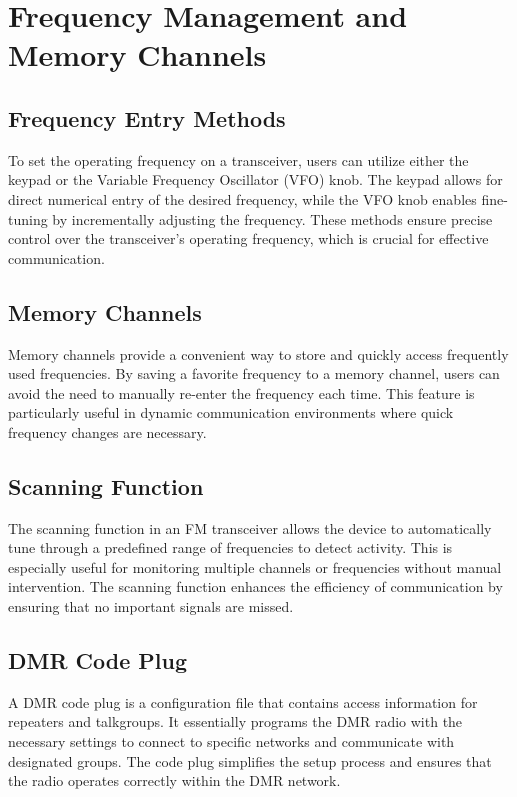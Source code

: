\section{Frequency Management and Memory Channels}
\label{section:frequency_management}

\subsection*{Frequency Entry Methods}
To set the operating frequency on a transceiver, users can utilize either the keypad or the Variable Frequency Oscillator (VFO) knob. The keypad allows for direct numerical entry of the desired frequency, while the VFO knob enables fine-tuning by incrementally adjusting the frequency. These methods ensure precise control over the transceiver's operating frequency, which is crucial for effective communication.

\subsection*{Memory Channels}
Memory channels provide a convenient way to store and quickly access frequently used frequencies. By saving a favorite frequency to a memory channel, users can avoid the need to manually re-enter the frequency each time. This feature is particularly useful in dynamic communication environments where quick frequency changes are necessary.

\subsection*{Scanning Function}
The scanning function in an FM transceiver allows the device to automatically tune through a predefined range of frequencies to detect activity. This is especially useful for monitoring multiple channels or frequencies without manual intervention. The scanning function enhances the efficiency of communication by ensuring that no important signals are missed.

\subsection*{DMR Code Plug}
A DMR code plug is a configuration file that contains access information for repeaters and talkgroups. It essentially programs the DMR radio with the necessary settings to connect to specific networks and communicate with designated groups. The code plug simplifies the setup process and ensures that the radio operates correctly within the DMR network.

